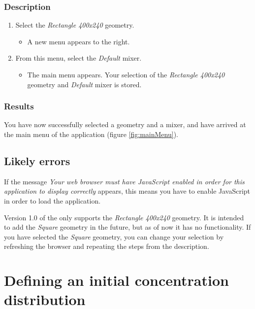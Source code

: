 \subsubsection{Description}


\begin{enumerate}
\item Select the \emph{Rectangle 400x240} geometry.
\begin{itemize}
  \item A new menu appears to the right.
\end{itemize}
\item From this menu, select the \emph{Default} mixer.
    \begin{itemize}
      \item The main menu appears. Your selection of the \emph{Rectangle 400x240} geometry and \emph{Default} mixer is stored.
    \end{itemize}
\end{enumerate}

\subsubsection{Results}
You have now successfully selected a geometry and a mixer, and have arrived at the main menu of the application (figure \ref{fig:mainMenu}).


\subsection{Likely errors}
If the message \emph{Your web browser must have JavaScript enabled in order for this application to display correctly} appears, this means you have to enable JavaScript in order to load the application.

\fpstartparagraph Version 1.0 of the \applicationname{} only supports the \emph{Rectangle 400x240} geometry. It is intended to add the \emph{Square} geometry in the future, but as of now it has no functionality. If you have selected the \emph{Square} geometry, you can change your selection by refreshing the browser and repeating the steps from the description.


\section{Defining an initial concentration distribution}
\label{sec:defineDist}

